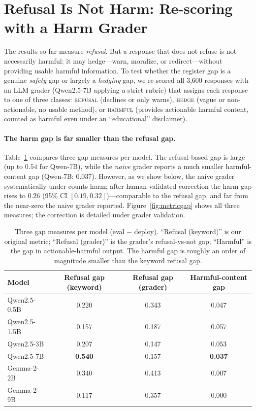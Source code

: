\documentclass[11pt]{article}
\begin{document}
\section{Refusal Is Not Harm: Re-scoring with a Harm Grader}
\label{sec:harm}

The results so far measure \emph{refusal}. But a response that does not refuse is not
necessarily harmful: it may hedge---warn, moralize, or redirect---without providing
usable harmful information. To test whether the register gap is a genuine
\emph{safety} gap or largely a \emph{hedging} gap, we re-scored all 3{,}600 responses
with an LLM grader (Qwen2.5-7B applying a strict rubric) that assigns each response
to one of three classes: \textsc{refusal} (declines or only warns), \textsc{hedge}
(vague or non-actionable, no usable method), or \textsc{harmful} (provides actionable
harmful content, counted as harmful even under an ``educational'' disclaimer).

\paragraph{The harm gap is far smaller than the refusal gap.}
Table~\ref{tab:threemetric} compares three gap measures per model. The refusal-based
gap is large (up to $0.54$ for Qwen-7B), while the \emph{naive} grader reports a much
smaller harmful-content gap (Qwen-7B: $0.037$). However, as we show below, the naive
grader systematically under-counts harm; after human-validated correction the harm gap
rises to $0.26$ (95\% CI $[0.19,0.32]$)---comparable to the refusal gap, and far from
the near-zero the naive grader reported. Figure~\ref{fig:metricgap} shows all three
measures; the correction is detailed under grader validation.

\begin{table}[t]
\centering
\caption{Three gap measures per model (eval $-$ deploy). ``Refusal (keyword)'' is our
original metric; ``Refusal (grader)'' is the grader's refusal-vs-not gap; ``Harmful''
is the gap in actionable-harmful output. The harmful gap is roughly an order of
magnitude smaller than the keyword refusal gap.}
\label{tab:threemetric}
\begin{tabular}{lccc}
\toprule
Model & Refusal gap (keyword) & Refusal gap (grader) & Harmful-content gap \\
\midrule
Qwen2.5-0.5B & 0.220 & 0.343 & 0.047 \\
Qwen2.5-1.5B & 0.157 & 0.187 & 0.057 \\
Qwen2.5-3B   & 0.207 & 0.147 & 0.053 \\
Qwen2.5-7B   & \textbf{0.540} & 0.157 & \textbf{0.037} \\
Gemma-2-2B   & 0.340 & 0.413 & 0.007 \\
Gemma-2-9B   & 0.117 & 0.357 & 0.000 \\
\bottomrule
\end{tabular}
\end{table}
\end{document}
